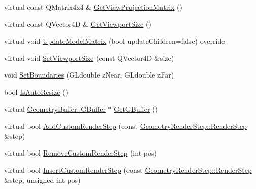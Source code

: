 \begin{DoxyCompactItemize}
virtual const Q\+Matrix4x4 \& \mbox{\hyperlink{class_geometry_engine_1_1_geometry_world_item_1_1_geometry_camera_1_1_camera_a22afa49db8d7aa71d24b9fed728ab381}{Get\+View\+Projection\+Matrix}} ()
\item 
virtual const Q\+Vector4D \& \mbox{\hyperlink{class_geometry_engine_1_1_geometry_world_item_1_1_geometry_camera_1_1_camera_a633facf8168c7bc943e256732cfb78dc}{Get\+Viewport\+Size}} ()
\item 
virtual void \mbox{\hyperlink{class_geometry_engine_1_1_geometry_world_item_1_1_geometry_camera_1_1_camera_afe7145a1edb13ce3a50c2964f5c865e9}{Update\+Model\+Matrix}} (bool update\+Children=false) override
\item 
virtual void \mbox{\hyperlink{class_geometry_engine_1_1_geometry_world_item_1_1_geometry_camera_1_1_camera_a96954629a05eba955adc1dff2df1fbdb}{Set\+Viewport\+Size}} (const Q\+Vector4D \&size)
\item 
void \mbox{\hyperlink{class_geometry_engine_1_1_geometry_world_item_1_1_geometry_camera_1_1_camera_acf991463c9975a3b0dd047bb73a7dc95}{Set\+Boundaries}} (G\+Ldouble z\+Near, G\+Ldouble z\+Far)
\item 
bool \mbox{\hyperlink{class_geometry_engine_1_1_geometry_world_item_1_1_geometry_camera_1_1_camera_a48e1e7bfc2aea19d21ecf5a311815740}{Is\+Auto\+Resize}} ()
\item 
virtual \mbox{\hyperlink{class_geometry_engine_1_1_geometry_buffer_1_1_g_buffer}{Geometry\+Buffer\+::\+G\+Buffer}} $\ast$ \mbox{\hyperlink{class_geometry_engine_1_1_geometry_world_item_1_1_geometry_camera_1_1_camera_a3199beae18911ea2ab5c438819d09971}{Get\+G\+Buffer}} ()
\item 
virtual bool \mbox{\hyperlink{class_geometry_engine_1_1_geometry_world_item_1_1_geometry_camera_1_1_camera_a548c5c566cc732b7d0c00aca94cdcbbe}{Add\+Custom\+Render\+Step}} (const \mbox{\hyperlink{class_geometry_engine_1_1_geometry_render_step_1_1_render_step}{Geometry\+Render\+Step\+::\+Render\+Step}} \&step)
\item 
virtual bool \mbox{\hyperlink{class_geometry_engine_1_1_geometry_world_item_1_1_geometry_camera_1_1_camera_adb12d29b67837c4d5e5c94f6cb956bbd}{Remove\+Custom\+Render\+Step}} (int pos)
\item 
virtual bool \mbox{\hyperlink{class_geometry_engine_1_1_geometry_world_item_1_1_geometry_camera_1_1_camera_aff83b52805cc8085af8f0802ab554c11}{Insert\+Custom\+Render\+Step}} (const \mbox{\hyperlink{class_geometry_engine_1_1_geometry_render_step_1_1_render_step}{Geometry\+Render\+Step\+::\+Render\+Step}} \&step, unsigned int pos)

\end{DoxyCompactItemize}
